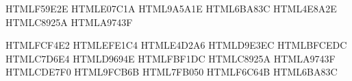  {HTML}{F59E2E}  %
 {HTML}{E07C1A}  %
 {HTML}{9A5A1E}  %
   {HTML}{6BA83C}  %
    {HTML}{4E8A2E}
 {HTML}{C8925A}  %
 {HTML}{A9743F}

    {HTML}{FCF4E2}  %
     {HTML}{EFE1C4}  %
   {HTML}{E4D2A6}
     {HTML}{D9E3EC}  %
 {HTML}{BFCEDC}
    {HTML}{C7D6E4}
  {HTML}{D9694E}  %
  {HTML}{FBF1DC}  %
  {HTML}{C8925A}  %
 {HTML}{A9743F}
  {HTML}{CDE7F0}  %
  {HTML}{9FCB6B}  %
 {HTML}{7FB050}
    {HTML}{F6C64B}  %
   {HTML}{6BA83C}

\newcommand{\capiframe}{\useasboundingbox (-2.75,-2.10) rectangle (2.75,2.25);}
